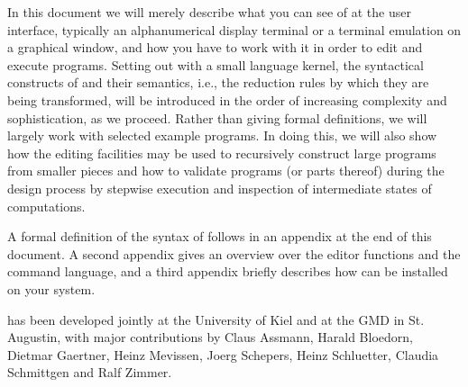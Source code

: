 In this document we will merely describe what you can see of \pired at
the
user interface, typically an alphanumerical display terminal or a terminal
emulation on a graphical window, and how you have to work with it
in order to edit and execute \kir programs. Setting out with a small
language kernel, 
the syntactical constructs of \kir and their
semantics, i.e., the reduction rules by which they are being transformed,
will be introduced in the order of increasing complexity and sophistication,
as we proceed.
Rather than giving formal definitions, we will  
largely work with selected example programs.
In doing this, we will also show
how the editing facilities may be used to recursively construct large programs
from smaller pieces and how to validate programs (or parts thereof)
during the design process by stepwise execution and inspection of
intermediate states of computations.  

A formal definition of the syntax of \kir follows in an appendix 
at the end of this document. A second appendix gives an overview
over the \pired editor functions and the command language, and a third appendix briefly describes how \pired can be installed on your system.

\pired has been developed jointly at the University of Kiel and at the
 GMD in St. Augustin, with major contributions by Claus Assmann, Harald Bloedorn, Dietmar Gaertner, Heinz Mevissen, Joerg Schepers, Heinz Schluetter, Claudia Schmittgen and Ralf Zimmer.

